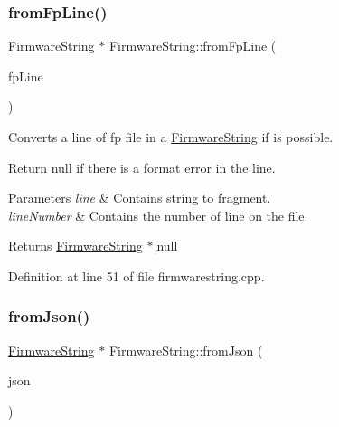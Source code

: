 \subsubsection{\texorpdfstring{from\+Fp\+Line()}{fromFpLine()}}
{\footnotesize\ttfamily \mbox{\hyperlink{classFirmwareString}{Firmware\+String}} $\ast$ Firmware\+String\+::from\+Fp\+Line (\begin{DoxyParamCaption}\item[{const Q\+String \&}]{fp\+Line }\end{DoxyParamCaption})\hspace{0.3cm}{\ttfamily [static]}}



Converts a line of fp file in a \mbox{\hyperlink{classFirmwareString}{Firmware\+String}} if is possible. 

Return null if there is a format error in the line. 
\begin{DoxyParams}{Parameters}
{\em line} & Contains string to fragment. \\
\hline
{\em line\+Number} & Contains the number of line on the file. \\
\hline
\end{DoxyParams}
\begin{DoxyReturn}{Returns}
\mbox{\hyperlink{classFirmwareString}{Firmware\+String}} $\ast$$\vert$null 
\end{DoxyReturn}


Definition at line 51 of file firmwarestring.\+cpp.

\mbox{\label{classFirmwareString_a94293dec7077d625c6b977f1f15bfd2d}} 
\subsubsection{\texorpdfstring{from\+Json()}{fromJson()}\hspace{0.1cm}{\footnotesize\ttfamily [1/2]}}
{\footnotesize\ttfamily \mbox{\hyperlink{classFirmwareString}{Firmware\+String}} $\ast$ Firmware\+String\+::from\+Json (\begin{DoxyParamCaption}\item[{Q\+String \&}]{json }\end{DoxyParamCaption})\hspace{0.3cm}{\ttfamily [static]}}



